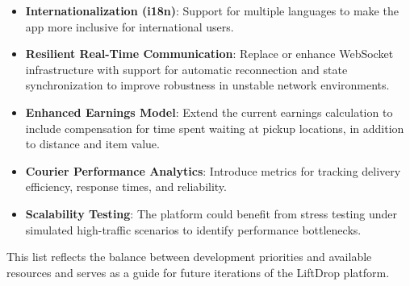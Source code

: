 \begin{itemize}
    \item \textbf{Internationalization (i18n)}: Support for multiple languages to make the app more inclusive for international users.

    \item \textbf{Resilient Real-Time Communication}: Replace or enhance WebSocket infrastructure with support for automatic reconnection and state synchronization to improve robustness in unstable network environments.

    \item \textbf{Enhanced Earnings Model}: Extend the current earnings calculation to include compensation for time spent waiting at pickup locations, in addition to distance and item value.

    \item \textbf{Courier Performance Analytics}: Introduce metrics for tracking delivery efficiency, response times, and reliability.
    
    \item \textbf{Scalability Testing}: The platform could benefit from stress testing under simulated high-traffic scenarios to identify performance bottlenecks.
\end{itemize}

This list reflects the balance between development priorities and available resources and serves as a guide for future iterations of the LiftDrop platform.
